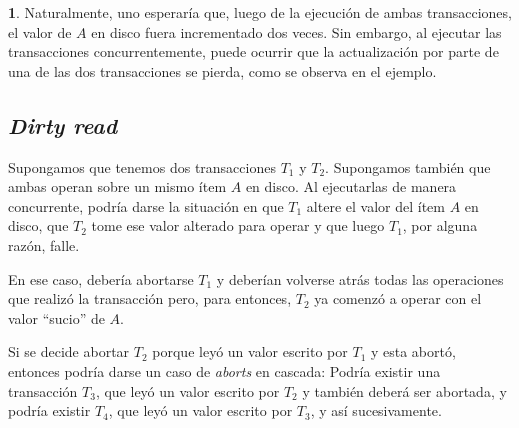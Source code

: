 \documentclass[english]{article}
\theoremstyle{definition}
\theoremstyle{definition}
\newtheorem{example}[thm]{\protect\examplename}
\providecommand{\examplename}{Ejemplo}
\begin{document}
\begin{example}
Naturalmente, uno esperaría que, luego de la ejecución de ambas transacciones,
el valor de $A$ en disco fuera incrementado dos veces. Sin embargo, al
ejecutar las transacciones concurrentemente, puede ocurrir que la
actualización por parte de una de las dos transacciones se pierda, como se
observa en el ejemplo.
\end{example}

\subsection{\emph{Dirty read}}

Supongamos que tenemos dos transacciones $T_1$ y $T_2$. Supongamos también que
ambas operan sobre un mismo ítem $A$ en disco. Al ejecutarlas de manera
concurrente, podría darse la situación en que $T_1$ altere el valor del ítem
$A$ en disco, que $T_2$ tome ese valor alterado para operar y que luego $T_1$,
por alguna razón, falle.

En ese caso, debería abortarse $T_1$ y deberían volverse atrás todas las
operaciones que realizó la transacción pero, para entonces, $T_2$ ya comenzó a
operar con el valor ``sucio'' de $A$.

Si se decide abortar $T_2$ porque leyó un valor escrito por $T_1$ y esta
abortó, entonces podría darse un caso de \emph{aborts} en cascada: Podría
existir una transacción $T_3$, que leyó un valor escrito por $T_2$ y también
deberá ser abortada, y podría existir $T_4$, que leyó un valor escrito por
$T_3$, y así sucesivamente.
\end{document}
